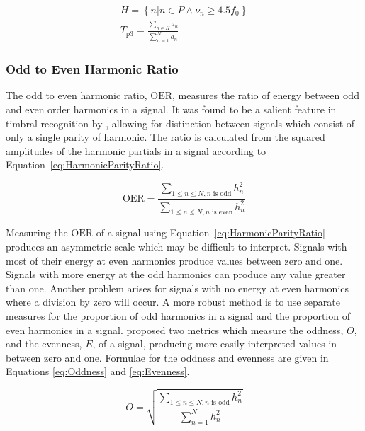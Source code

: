 			\begin{gather}
				H = \left\{ n | n \in P \land \nu_{n} \geq 4.5f_{0} \right\} \nonumber \\[0.6em]
				T_{\mathrm{p}3} = \frac{\sum_{n \in H} a_{n}}{\sum_{n = 1}^{N} a_{n}}
				\label{eq:PeakTristimulus3}
			\end{gather}

		\subsubsection*{Odd to Even Harmonic Ratio}
			The odd to even harmonic ratio, $\mathrm{OER}$, measures the ratio of energy between odd and even
			order harmonics in a signal. It was found to be a salient feature in timbral recognition by
			\citet{hall2010importance}, allowing for distinction between signals which consist of only a single
			parity of harmonic. The ratio is calculated from the squared amplitudes of the harmonic partials in
			a signal according to Equation~\ref{eq:HarmonicParityRatio}.
			
			\begin{equation}
				\mathrm{OER} = \frac{\sum_{1 \leq n \leq N, n \text{ is odd}} h_{n}^{2}}
					       {\sum_{1 \leq n \leq N, n \text{ is even}} h_{n}^{2}}
				\label{eq:HarmonicParityRatio}
			\end{equation}

			Measuring the $\mathrm{OER}$ of a signal using Equation~\ref{eq:HarmonicParityRatio} produces an
			asymmetric scale which may be difficult to interpret.  Signals with most of their energy at even
			harmonics produce values between zero and one.  Signals with more energy at the odd harmonics can
			produce any value greater than one. Another problem arises for signals with no energy at even
			harmonics where a division by zero will occur. A more robust method is to use separate measures for
			the proportion of odd harmonics in a signal and the proportion of even harmonics in a signal.
			\citet{lukasik2005towards} proposed two metrics which measure the oddness, $O$, and the evenness,
			$E$, of a signal, producing more easily interpreted values in between zero and one. Formulae for
			the oddness and evenness are given in Equations \ref{eq:Oddness} and \ref{eq:Evenness}.

			\begin{equation}
				O = \sqrt{\frac{\sum_{1 \leq n \leq N, n \text{ is odd}} h_{n}^{2}}
					       {\sum_{n = 1}^{N} h_{n}^{2}}}
				\label{eq:Oddness}
			\end{equation}


